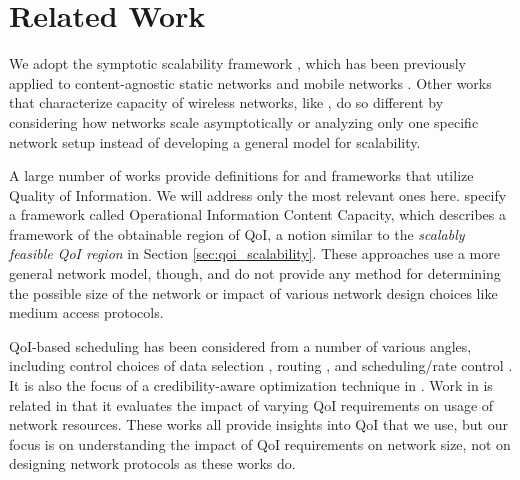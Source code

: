 
\section{Related Work}
\label{sec:related_work}


We adopt the symptotic scalability framework \cite{scalability_manets_theory_vs_practice}, which has been previously applied to content-agnostic static networks \cite{symptotics_framework_scalability} and mobile networks \cite{scal_analysis_mobility}.  Other works that characterize capacity of wireless networks, like \cite{li_capacity, gupta2000capacity, nom_cap_wmns}, do so different by considering how networks scale asymptotically or analyzing only one specific network setup instead of developing a general model for scalability.

A large number of works provide definitions for and frameworks that utilize Quality of Information.  We will address only the most relevant ones here.  \cite{qoi_aware_tactical_mil_nets} \cite{qoi_aware_trx_pol_time_vary_links} specify a framework called Operational Information Content Capacity, which describes a framework of the obtainable region of QoI, a notion similar to the \emph{scalably feasible QoI region} in Section \ref{sec:qoi_scalability}.  These approaches use a more general network model, though, and do not provide any method for determining the possible size of the network or impact of various network design choices like medium access protocols.  

QoI-based scheduling has been considered from a number of various angles, including control choices of data selection \cite{dcoss_max_cov, opt_qoi_data_collection_bijarbooneh}, routing \cite{quality_aware_routing_tan}, and scheduling/rate control \cite{qoi_sched_task_proc_nets, toward_qoi_rate_control}.  It is also the focus of a credibility-aware optimization technique in \cite{social_swarming}.  Work in \cite{qoi_aware_mobile_apps} is related in that it evaluates the impact of varying QoI requirements on usage of network resources.  These works all provide insights into QoI that we use, but our focus is on understanding the impact of QoI requirements on network size, not on designing network protocols as these works do.

